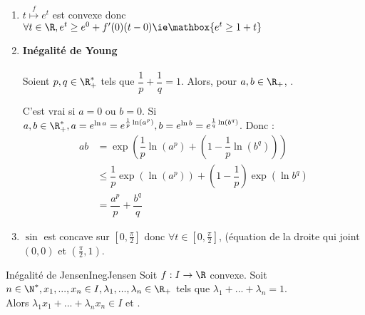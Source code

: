 \documentclass[12pt,a4paper]{report}
\begin{document}
\begin{application}{}{}
\begin{enumerate}
	\item $t \overset{f}{\mapsto} e^t$ est convexe donc $\forall t \in \R, e^t \ge e^0 + f'(0)(t-0) \ie \mathbox{e^t \ge 1+t}$
	\item \textbf{Inégalité de Young} \\ \\
		Soient $p,q \in \R_+^*$ tels que $\dfrac{1}{p} + \dfrac{1}{q}=1$. Alors, pour $a,b \in \R_+$, .
		\begin{demo}
			C'est vrai si $a=0$ ou $b=0$.
			Si $a,b \in \R_+^*, a = e^{\ln a} = e^{\frac{1}{p}\ln(a^p)}, b = e^{\ln b} = e^{\frac{1}{q}\ln(b^q)}$.
			Donc  : 
			\begin{align*}
			ab &= \exp \left(\dfrac{1}{p}\ln(a^p) + \left(1-\dfrac{1}{p}\ln(b^q)\right)\right) \\
			&\le \dfrac{1}{p}\exp(\ln(a^p)) + \left(1-\dfrac{1}{p}\right)\exp(\ln b^q) \\
			&= \dfrac{a^p}{p} + \dfrac{b^q}{q}
			\end{align*}
		\end{demo}
	\item $\sin$ est concave sur $[0,\frac{\pi}{2}]$ donc $\forall t \in [0,\frac{\pi}{2}]$,  (équation de la droite qui joint $(0, 0)$ et $(\frac{\pi}{2},1)$.
\end{enumerate}
\end{application}


\begin{theoreme}{Inégalité de Jensen}{InegJensen}
Soit $f : I \to \R$ convexe. Soit $n \in \N^*, x_1,...,x_n \in I, \lambda_1,...,\lambda_n \in \R_+$ tels que $\lambda_1 + ... + \lambda_n = 1$. \\
Alors $\lambda_1x_1+...+ \lambda_nx_n \in I$ et .
\end{theoreme}
\end{document}

